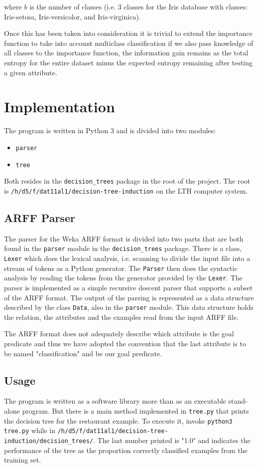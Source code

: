 \documentclass{article}
\begin{document}
\noindent where $b$ is the number of classes (i.e. 3 classes for the Iris database with classes: Iris-setosa, Iris-versicolor, and Iris-virginica).

Once this has been taken into consideration it is trivial to extend the importance function to take into account multiclass classification if we also pass knowledge of all classes to the importance function, the information gain remains as the total entropy for the entire dataset minus the expected entropy remaining after testing a given attribute.



\section{Implementation}
The program is written in Python 3 and is divided into two modules:
\begin{itemize}
    \item \texttt{parser}
    \item \texttt{tree}
\end{itemize}
Both resides in the \texttt{decision\_trees} package in the root of the project. The root is \texttt{/h/d5/f/dat11al1/decision-tree-induction} on the LTH computer system.

\subsection{ARFF Parser}
The parser for the Weka ARFF format is divided into two parts that are both found in the \texttt{parser} module in the \texttt{decision\_trees} package. There is a class, \texttt{Lexer} which does the lexical analysis, i.e. scanning to divide the input file into a stream of tokens as a Python generator. The \texttt{Parser} then does the syntactic analysis by reading the tokens from the generator provided by the \texttt{Lexer}. The parser is implemented as a simple recursive descent parser that supports a subset of the ARFF format. The output of the parsing is represented as a data structure described by the class \texttt{Data}, also in the \texttt{parser} module. This data structure holds the relation, the attributes and the examples read from the input ARFF file.

The ARFF format does not adequately describe which attribute is the goal predicate and thus we have adopted the convention that the last attribute is to be named "classification" and be our goal predicate. 

\subsection{Usage}
The program is written as a software library more than as an executable stand-alone program. But there is a main method implemented in \texttt{tree.py} that prints the decision tree for the restaurant example. To execute it, invoke \texttt{python3 tree.py} while in \texttt{/h/d5/f/dat11al1/decision-tree-induction/decision\_trees/}. The last number printed is "1.0" and indicates the performance of the tree as the proportion correctly classified examples from the training set.
\end{document}
